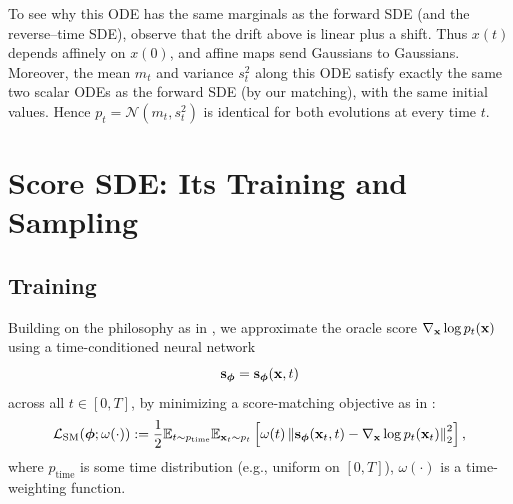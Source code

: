 To see why this ODE has the same marginals as the forward SDE (and the reverse–time SDE), observe that the drift above is linear plus a shift. Thus $x(t)$ depends affinely on $x(0)$, and affine maps send Gaussians to Gaussians. Moreover, the mean $m_t$ and variance $s_t^2$ along this ODE satisfy exactly the same two scalar ODEs as the forward SDE (by our matching), with the same initial values. Hence $p_t=\mathcal N(m_t,s_t^2)$ is identical for both evolutions at every time $t$.





\clearpage
\newpage




\section{Score SDE: Its Training and Sampling}\label{sec:scoresde-training-sampling}

\subsection{Training}\label{subsec:sde-train}
Building on the philosophy as in , we approximate the oracle score $\nabla_{{\mathbf{x}}} \log p_t({\mathbf{x}})$ using a time-conditioned neural network 
\[
\mathbf{s}_{\bm{\phi}} = \mathbf{s}_{\bm{\phi}}({\mathbf{x}}, t)
\]
across all $t\in[0,T]$, by minimizing a score-matching objective as in :
\begin{equation*}
\mathcal{L}_{\text{SM}}(\bm{\phi}; \omega(\cdot)) := \frac{1}{2} \mathbb{E}_{t\sim p_{\text{time}}}  \mathbb{E}_{{\mathbf{x}}_t \sim p_t}\left[\omega(t) \left\|\mathbf{s}_{\bm{\phi}}({\mathbf{x}}_t, t) - \nabla_{{\mathbf{x}}} \log p_t({\mathbf{x}}_t)\right\|_2^2\right],
\end{equation*}
where $p_{\text{time}}$ is some time distribution (e.g., uniform on $[0,T]$), $\omega(\cdot)$ is a time-weighting function.

